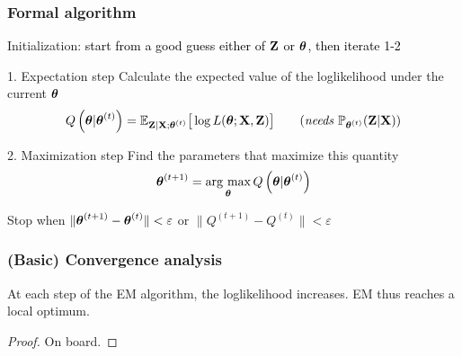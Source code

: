 \documentclass{beamer}\usepackage[]{graphicx}\usepackage[]{color}
\begin{document}
\begin{frame}
  \frametitle{Formal algorithm}

  \begin{block}{Initialization: \textcolor{black}{start from a good guess either of $\mathbf{Z}$ or $\boldsymbol\theta$, then iterate 1-2}}
  \end{block}

  \begin{block}{1. Expectation step}
    Calculate the expected value of the loglikelihood under the current $\boldsymbol\theta$
    \begin{equation*}
      Q\left(\boldsymbol\theta|\boldsymbol\theta^{(t)}\right) = \mathbb{E}_{\mathbf{Z}|\mathbf{X};\boldsymbol\theta^{(t)}}\big[ \log L (\boldsymbol\theta;\mathbf{X},\mathbf{Z})  \big] \qquad (\textit {needs } \mathbb{P}_{\boldsymbol\theta^{(t)}}(\mathbf{Z}|\mathbf{X}))
    \end{equation*}
  \end{block}

  \vfill

  \begin{block}{2. Maximization step}
    Find the parameters that maximize this quantity
    \begin{equation*}
      \boldsymbol\theta^{(t+1)} = \mathop{\mathrm{arg\ max}}_{\boldsymbol\theta} Q\left(\boldsymbol\theta|\boldsymbol\theta^{(t)}\right)
    \end{equation*}
  \end{block}

  Stop when $\|\boldsymbol\theta^{(t+1)} - \boldsymbol\theta^{(t)}\| < \varepsilon$ or $\|Q^{(t+1)} - Q^{(t)}\| < \varepsilon$

\end{frame}

\begin{frame}
  \frametitle{(Basic) Convergence analysis}

  \begin{theorem}
    At each step of the EM algorithm, the loglikelihood increases. EM thus reaches a local optimum.
  \end{theorem}

  \begin{proof}
    On board.
  \end{proof}

\end{frame}
\end{document}
